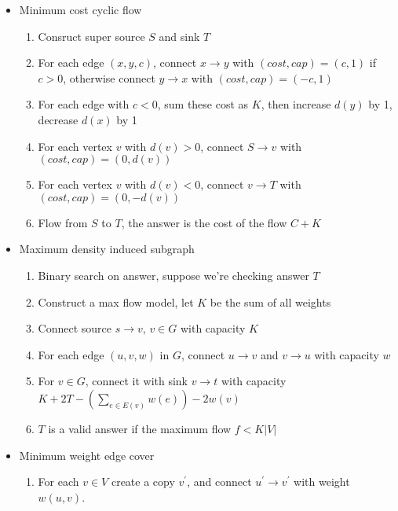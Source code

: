 \begin{itemize}
\begin{enumerate}
    \end{enumerate}
    \item Minimum cost cyclic flow
    \vspace{-1em}
    \begin{enumerate}
        \itemsep-0.3em
        \item Consruct super source $S$ and sink $T$
        \item For each edge $(x, y, c)$, connect $x \rightarrow y$ with $(cost, cap) = (c, 1)$ if $c > 0$, otherwise connect $y \rightarrow x$ with $(cost, cap) = (-c, 1)$
        \item For each edge with $c < 0$, sum these cost as $K$, then increase $d(y)$ by 1, decrease $d(x)$ by 1
        \item For each vertex $v$ with $d(v) > 0$, connect $S \rightarrow v$ with $(cost, cap) = (0, d(v))$
        \item For each vertex $v$ with $d(v) < 0$, connect $v \rightarrow T$ with $(cost, cap) = (0, -d(v))$
        \item Flow from $S$ to $T$, the answer is the cost of the flow $C + K$
    \end{enumerate}
    \item Maximum density induced subgraph
    \vspace{-1em}
    \begin{enumerate}
        \itemsep-0.3em
        \item Binary search on answer, suppose we're checking answer $T$
        \item Construct a max flow model, let $K$ be the sum of all weights
        \item Connect source $s \rightarrow v$, $v \in G$ with capacity $K$
        \item For each edge $(u, v, w)$ in $G$, connect $u \rightarrow v$ and $v \rightarrow u$ with capacity $w$
        \item For $v \in G$, connect it with sink $v \rightarrow t$ with capacity $K + 2T - (\sum_{e \in E(v)}{w(e)}) - 2w(v)$
        \item $T$ is a valid answer if the maximum flow $f < K \lvert V \rvert$
    \end{enumerate}
    \item Minimum weight edge cover
    \vspace{-1em}
    \begin{enumerate}
        \itemsep-0.3em
      \item For each $v \in V$ create a copy $v^\prime$, and connect $u^\prime \to v^\prime$ with weight $w(u, v)$.

\end{enumerate}
\end{itemize}
